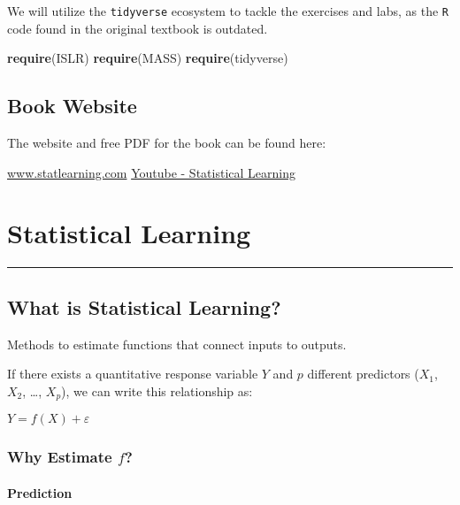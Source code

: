 \documentclass[]{book}
\newenvironment{Shaded}{\begin{snugshade}}{\end{snugshade}}
\newcommand{\KeywordTok}[1]{\textcolor[rgb]{0.13,0.29,0.53}{\textbf{#1}}}
\newcommand{\NormalTok}[1]{#1}
\theoremstyle{definition}
\theoremstyle{definition}
\theoremstyle{definition}
\theoremstyle{remark}
\begin{document}
We will utilize the \texttt{tidyverse} ecosystem to tackle the exercises
and labs, as the \texttt{R} code found in the original textbook is
outdated.

\begin{Shaded}
\begin{Highlighting}[]
\KeywordTok{require}\NormalTok{(ISLR)}
\KeywordTok{require}\NormalTok{(MASS)}
\KeywordTok{require}\NormalTok{(tidyverse)}
\end{Highlighting}
\end{Shaded}

\section{Book Website}\label{book-website}

The website and free PDF for the book can be found here:

\href{http://www-bcf.usc.edu/~gareth/ISL/}{www.statlearning.com}
\href{https://www.youtube.com/channel/UC4OWDcPB1peiBXDfCSZ3h-w}{Youtube
- Statistical Learning}

\chapter{Statistical Learning}\label{statistical-learning}

\begin{center}\rule{0.5\linewidth}{\linethickness}\end{center}

\section{What is Statistical
Learning?}\label{what-is-statistical-learning}

Methods to estimate functions that connect inputs to outputs.

If there exists a quantitative response variable \(Y\) and \(p\)
different predictors (\(X_1\), \(X_2\), \ldots{}, \(X_p\)), we can write
this relationship as:

\(Y = f(X) + ε\)

\subsection{\texorpdfstring{Why Estimate
\emph{\(f\)}?}{Why Estimate f?}}\label{why-estimate-f}

\subsubsection{Prediction}\label{prediction}
\end{document}
